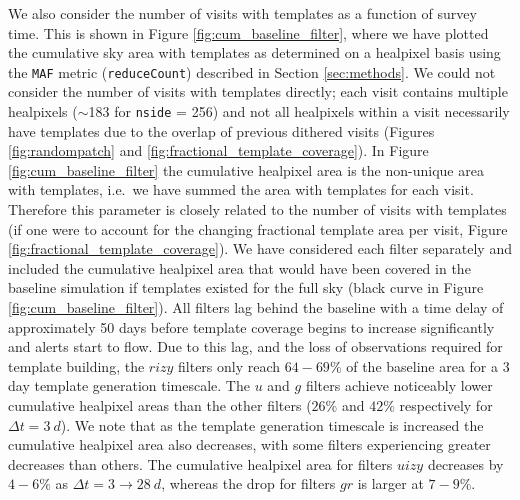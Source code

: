 \documentclass[preprintm,linenumbers]{aastex631}
\newcommand{\maf}{\texttt{MAF}\xspace}
\begin{document}
  We also consider the number of visits with templates as a function of survey time.
		This is shown in Figure \ref{fig:cum_baseline_filter}, where we have plotted the cumulative sky area with templates as determined on a healpixel basis using the \maf metric (\verb|reduceCount|) described in Section \ref{sec:methods}.
		We could not consider the number of visits with templates directly; each visit contains multiple healpixels ($\sim$183 for \texttt{nside} = 256) and not all healpixels within a visit necessarily have templates due to the overlap of previous dithered visits (Figures \ref{fig:randompatch} and \ref{fig:fractional_template_coverage}). %
		In Figure \ref{fig:cum_baseline_filter} the cumulative healpixel area is the non-unique area with templates, i.e.\ we have summed the area with templates for each visit. 		
		Therefore this parameter is closely related to the number of visits with templates (if one were to account for the changing fractional template area per visit, Figure \ref{fig:fractional_template_coverage}).
		We have considered each filter separately and included the cumulative healpixel area that would have been covered in the baseline simulation if templates existed for the full sky (black curve in Figure \ref{fig:cum_baseline_filter}).
		All filters lag behind the baseline with a time delay of approximately 50 days before template coverage begins to increase significantly and alerts start to flow.
  Due to this lag, and the loss of observations required for template building, the $rizy$ filters only reach $64-69\%$ of the baseline area for a 3 day template generation timescale.
		The $u$ and $g$ filters achieve noticeably lower cumulative healpixel areas than the other filters ($26\%$ and $42\%$ respectively for $\Delta t = 3\ \si{d}$).
		We note that as the template generation timescale is increased the cumulative healpixel area also decreases, with some filters experiencing greater decreases than others.
		The cumulative healpixel area for filters $uizy$ decreases by $4-6\%$ as $\Delta t = 3 \rightarrow 28\ \si{d}$, whereas the drop for filters $gr$ is larger at $7 - 9 \%$. %
\end{document}
